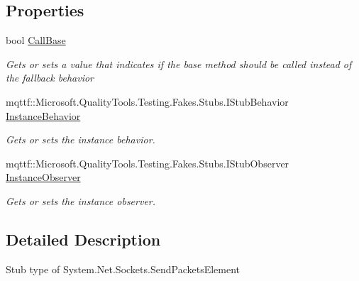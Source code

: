 \subsection*{Properties}
\begin{DoxyCompactItemize}
\item 
bool \hyperlink{class_system_1_1_net_1_1_sockets_1_1_fakes_1_1_stub_send_packets_element_ac6aaa9cf586abd8823395b7942d3b24a}{Call\-Base}
\begin{DoxyCompactList}\small\item\em Gets or sets a value that indicates if the base method should be called instead of the fallback behavior\end{DoxyCompactList}\item 
mqttf\-::\-Microsoft.\-Quality\-Tools.\-Testing.\-Fakes.\-Stubs.\-I\-Stub\-Behavior \hyperlink{class_system_1_1_net_1_1_sockets_1_1_fakes_1_1_stub_send_packets_element_a115c585c67d95b1192bcd3c226bd8923}{Instance\-Behavior}
\begin{DoxyCompactList}\small\item\em Gets or sets the instance behavior.\end{DoxyCompactList}\item 
mqttf\-::\-Microsoft.\-Quality\-Tools.\-Testing.\-Fakes.\-Stubs.\-I\-Stub\-Observer \hyperlink{class_system_1_1_net_1_1_sockets_1_1_fakes_1_1_stub_send_packets_element_a140327df30f9fef8032b381f92805a4e}{Instance\-Observer}
\begin{DoxyCompactList}\small\item\em Gets or sets the instance observer.\end{DoxyCompactList}\end{DoxyCompactItemize}


\subsection{Detailed Description}
Stub type of System.\-Net.\-Sockets.\-Send\-Packets\-Element



